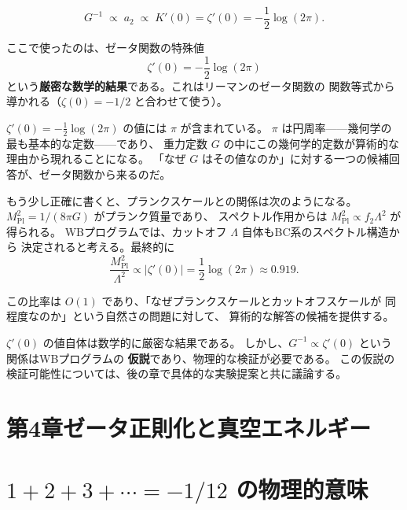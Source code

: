 \begin{keybox}[$G$ の算術的起源]
\[
  G^{-1} \;\propto\; a_2 \;\propto\; K'(0) = \zeta'(0)
        = -\frac{1}{2}\log(2\pi).
\]
\end{keybox}

\noindent ここで使ったのは、ゼータ関数の特殊値
\[
  \zeta'(0) = -\frac{1}{2}\log(2\pi)
\]
という\textbf{厳密な数学的結果}である。これはリーマンのゼータ関数の
関数等式から導かれる（$\zeta(0) = -1/2$ と合わせて使う）。

\begin{hsbox}
$\zeta'(0) = -\frac{1}{2}\log(2\pi)$ の値には $\pi$ が含まれている。
$\pi$ は円周率——幾何学の最も基本的な定数——であり、
重力定数 $G$ の中にこの幾何学的定数が算術的な理由から現れることになる。
「なぜ $G$ はその値なのか」に対する一つの候補回答が、ゼータ関数から来るのだ。
\end{hsbox}

もう少し正確に書くと、プランクスケールとの関係は次のようになる。
$M_{\mathrm{Pl}}^2 = 1/(8\pi G)$ がプランク質量であり、
スペクトル作用からは $M_{\mathrm{Pl}}^2 \propto f_2\Lambda^2$ が得られる。
WBプログラムでは、カットオフ $\Lambda$ 自体もBC系のスペクトル構造から
決定されると考える。最終的に
\[
  \frac{M_{\mathrm{Pl}}^2}{\Lambda^2} \propto |\zeta'(0)| = \frac{1}{2}\log(2\pi)
  \approx 0.919.
\]

この比率は $O(1)$ であり、「なぜプランクスケールとカットオフスケールが
同程度なのか」という自然さの問題に対して、
算術的な解答の候補を提供する。

\begin{rmk}
$\zeta'(0)$ の値自体は数学的に厳密な結果である。
しかし、$G^{-1} \propto \zeta'(0)$ という関係はWBプログラムの
\textbf{仮説}であり、物理的な検証が必要である。
この仮説の検証可能性については、後の章で具体的な実験提案と共に議論する。
\end{rmk}


\section*{第4章\quad ゼータ正則化と真空エネルギー}

\section{$1+2+3+\cdots = -1/12$ の物理的意味}
\label{sec:4.1}

